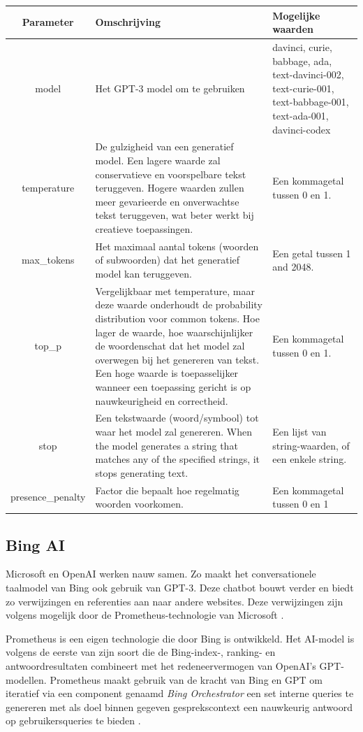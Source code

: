 \begin{tabular}{|c|p{7cm}|p{5cm}|}
	\hline
	Parameter & Omschrijving & Mogelijke waarden \\
	\hline
	model & Het GPT-3 model om te gebruiken & davinci, curie, babbage, ada, text-davinci-002, text-curie-001, text-babbage-001, text-ada-001, davinci-codex \\
	\hline
	temperature & De gulzigheid van een generatief model. Een lagere waarde zal conservatieve en voorspelbare tekst teruggeven. Hogere waarden zullen meer gevarieerde en onverwachtse tekst teruggeven, wat beter werkt bij creatieve toepassingen. & Een kommagetal tussen 0 en 1. \\
	\hline
	max\_tokens & Het maximaal aantal tokens (woorden of subwoorden) dat het generatief model kan teruggeven. & Een getal tussen 1 and 2048. \\
	\hline
	top\_p & Vergelijkbaar met temperature, maar deze waarde onderhoudt de probability distribution voor common tokens. Hoe lager de waarde, hoe waarschijnlijker de woordenschat dat het model zal overwegen bij het genereren van tekst. Een hoge waarde is toepasselijker wanneer een toepassing gericht is op nauwkeurigheid en correctheid. & Een kommagetal tussen 0 en 1. \\
	\hline
	stop & Een tekstwaarde (woord/symbool) tot waar het model zal genereren. When the model generates a string that matches any of the specified strings, it stops generating text. & Een lijst van string-waarden, of een enkele string. \\
	\hline
	presence\_penalty & Factor die bepaalt hoe regelmatig woorden voorkomen. & Een kommagetal tussen 0 en 1 \\
	\hline
\end{tabular}

\subsection{Bing AI}

Microsoft en OpenAI werken nauw samen. Zo maakt het conversationele taalmodel van Bing ook gebruik van GPT-3. Deze chatbot bouwt verder en biedt zo verwijzingen en referenties aan naar andere websites. Deze verwijzingen zijn volgens mogelijk door de Prometheus-technologie van Microsoft \autocite{Ribas2023}.

Prometheus is een eigen technologie die door Bing is ontwikkeld. Het AI-model is volgens \textcite{Ribas2023} de eerste van zijn soort die de Bing-index-, ranking- en antwoordresultaten combineert met het redeneervermogen van OpenAI’s GPT-modellen. Prometheus maakt gebruik van de kracht van Bing en GPT om iteratief via een component genaamd \textit{Bing Orchestrator} een set interne queries te genereren met als doel binnen gegeven gesprekscontext een nauwkeurig antwoord op gebruikersqueries te bieden \autocite{Ribas2023}.

